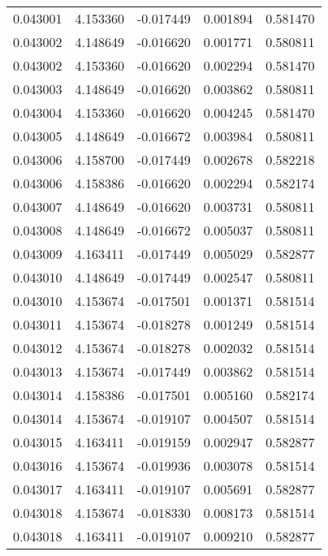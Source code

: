 \begin{tabular}{lrrrr}
0.043001    &  4.153360 & -0.017449 &  0.001894 &             0.581470 \\
0.043002    &  4.148649 & -0.016620 &  0.001771 &             0.580811 \\
0.043002    &  4.153360 & -0.016620 &  0.002294 &             0.581470 \\
0.043003    &  4.148649 & -0.016620 &  0.003862 &             0.580811 \\
0.043004    &  4.153360 & -0.016620 &  0.004245 &             0.581470 \\
0.043005    &  4.148649 & -0.016672 &  0.003984 &             0.580811 \\
0.043006    &  4.158700 & -0.017449 &  0.002678 &             0.582218 \\
0.043006    &  4.158386 & -0.016620 &  0.002294 &             0.582174 \\
0.043007    &  4.148649 & -0.016620 &  0.003731 &             0.580811 \\
0.043008    &  4.148649 & -0.016672 &  0.005037 &             0.580811 \\
0.043009    &  4.163411 & -0.017449 &  0.005029 &             0.582877 \\
0.043010    &  4.148649 & -0.017449 &  0.002547 &             0.580811 \\
0.043010    &  4.153674 & -0.017501 &  0.001371 &             0.581514 \\
0.043011    &  4.153674 & -0.018278 &  0.001249 &             0.581514 \\
0.043012    &  4.153674 & -0.018278 &  0.002032 &             0.581514 \\
0.043013    &  4.153674 & -0.017449 &  0.003862 &             0.581514 \\
0.043014    &  4.158386 & -0.017501 &  0.005160 &             0.582174 \\
0.043014    &  4.153674 & -0.019107 &  0.004507 &             0.581514 \\
0.043015    &  4.163411 & -0.019159 &  0.002947 &             0.582877 \\
0.043016    &  4.153674 & -0.019936 &  0.003078 &             0.581514 \\
0.043017    &  4.163411 & -0.019107 &  0.005691 &             0.582877 \\
0.043018    &  4.153674 & -0.018330 &  0.008173 &             0.581514 \\
0.043018    &  4.163411 & -0.019107 &  0.009210 &             0.582877 \\

\end{tabular}
